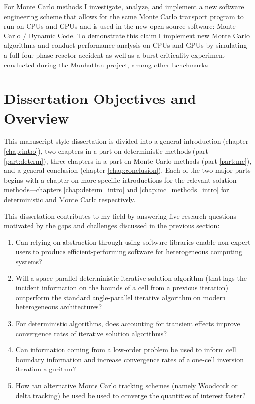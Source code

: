 For Monte Carlo methods I investigate, analyze, and implement a new software engineering scheme that allows for the same Monte Carlo transport program to run on CPUs and GPUs and is used in the new open source software: Monte Carlo / Dynamic Code.
To demonstrate this claim I implement new Monte Carlo algorithms and conduct performance analysis on CPUs and GPUs by simulating a full four-phase reactor accident as well as a burst criticality experiment conducted during the Manhattan project, among other benchmarks.

\section{Dissertation Objectives and Overview}
\label{sec:research_qustions}

This manuscript-style dissertation is divided into a general introduction (chapter \ref{chap:intro}), two chapters in a part on deterministic methods (part \ref{part:determ}), three chapters in a part on Monte Carlo methods (part \ref{part:mc}), and a general conclusion (chapter \ref{chap:conclusion}).
Each of the two major parts begins with a chapter on more specific introductions for the relevant solution methods---chapters \ref{chap:determ_intro} and \ref{chap:mc_methods_intro} for deterministic and Monte Carlo respectively.

This dissertation contributes to my field by answering five research questions motivated by the gaps and challenges discussed in the previous section:
\begin{enumerate}
    \item Can relying on abstraction through using software libraries enable non-expert users to produce efficient-performing software for heterogeneous computing systems?
    \item Will a space-parallel deterministic iterative solution algorithm (that lags the incident information on the bounds of a cell from a previous iteration) outperform the standard angle-parallel iterative algorithm on modern heterogeneous architectures?
    \item For deterministic algorithms, does accounting for transient effects improve convergence rates of iterative solution algorithms?
    \item Can information coming from a low-order problem be used to inform cell boundary information and increase convergence rates of a one-cell inversion iteration algorithm?
    \item How can alternative Monte Carlo tracking schemes (namely Woodcock or delta tracking) be used be used to converge the quantities of interest faster?
\end{enumerate}

